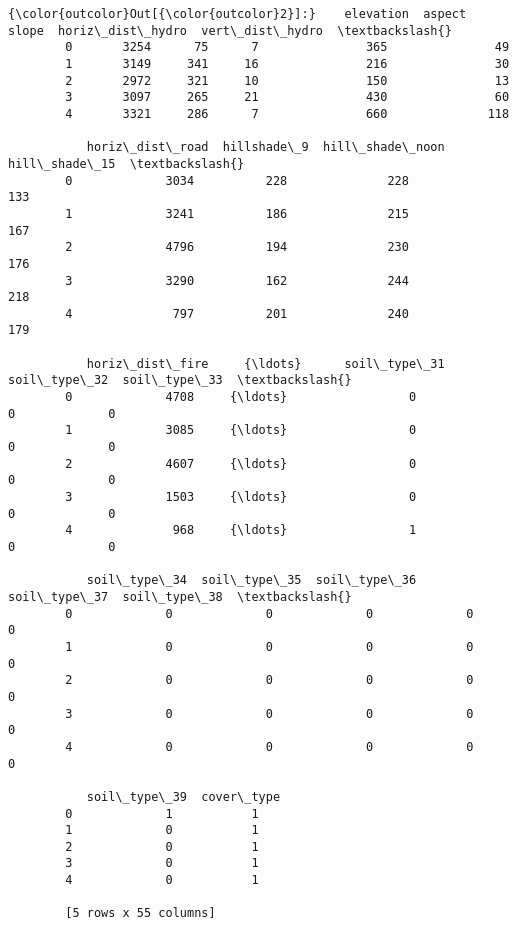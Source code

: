 \documentclass[11pt]{article}
\begin{document}
\begin{Verbatim}[commandchars=\\\{\}]
{\color{outcolor}Out[{\color{outcolor}2}]:}    elevation  aspect  slope  horiz\_dist\_hydro  vert\_dist\_hydro  \textbackslash{}
        0       3254      75      7               365               49   
        1       3149     341     16               216               30   
        2       2972     321     10               150               13   
        3       3097     265     21               430               60   
        4       3321     286      7               660              118   
        
           horiz\_dist\_road  hillshade\_9  hill\_shade\_noon  hill\_shade\_15  \textbackslash{}
        0             3034          228              228            133   
        1             3241          186              215            167   
        2             4796          194              230            176   
        3             3290          162              244            218   
        4              797          201              240            179   
        
           horiz\_dist\_fire     {\ldots}      soil\_type\_31  soil\_type\_32  soil\_type\_33  \textbackslash{}
        0             4708     {\ldots}                 0             0             0   
        1             3085     {\ldots}                 0             0             0   
        2             4607     {\ldots}                 0             0             0   
        3             1503     {\ldots}                 0             0             0   
        4              968     {\ldots}                 1             0             0   
        
           soil\_type\_34  soil\_type\_35  soil\_type\_36  soil\_type\_37  soil\_type\_38  \textbackslash{}
        0             0             0             0             0             0   
        1             0             0             0             0             0   
        2             0             0             0             0             0   
        3             0             0             0             0             0   
        4             0             0             0             0             0   
        
           soil\_type\_39  cover\_type  
        0             1           1  
        1             0           1  
        2             0           1  
        3             0           1  
        4             0           1  
        
        [5 rows x 55 columns]
\end{Verbatim}
            
\end{document}
